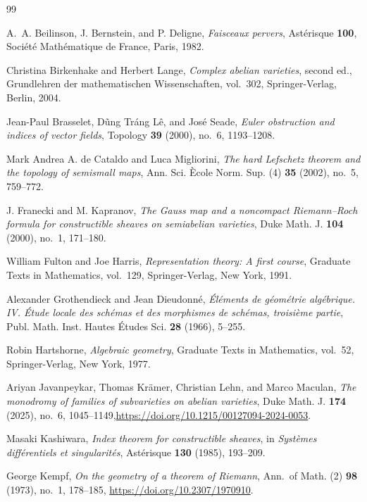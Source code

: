 \begin{thebibliography}{99}

A.~A. Beilinson, J. Bernstein, and P. Deligne,
\emph{Faisceaux pervers}, Ast\'erisque \textbf{100}, Soci\'et\'e Math\'ematique de France, Paris, 1982.

Christina Birkenhake and Herbert Lange,
\emph{Complex abelian varieties}, second ed., Grundlehren der mathematischen Wissenschaften, vol.~302, Springer-Verlag, Berlin, 2004.

Jean-Paul Brasselet, D\~ung Tr\'ang L\^e, and Jos\'e Seade,
\emph{Euler obstruction and indices of vector fields}, Topology \textbf{39} (2000), no.~6, 1193--1208.

Mark Andrea A. de Cataldo and Luca Migliorini,
\emph{The hard Lefschetz theorem and the topology of semismall maps}, Ann. Sci. \`Ecole Norm. Sup. (4) \textbf{35} (2002), no.~5, 759--772.

J. Franecki and M. Kapranov,
\emph{The Gauss map and a noncompact Riemann--Roch formula for constructible sheaves on semiabelian varieties}, Duke Math. J. \textbf{104} (2000), no.~1, 171--180.

William Fulton and Joe Harris,
\emph{Representation theory: A first course}, Graduate Texts in Mathematics, vol.~129, Springer-Verlag, New York, 1991.

Alexander Grothendieck and Jean Dieudonn\'e,
\emph{\'El\'ements de g\'eom\'etrie alg\'ebrique. IV. \'Etude locale des sch\'emas et des morphismes de sch\'emas, troisi\`eme partie}, Publ. Math. Inst. Hautes \'Etudes Sci. \textbf{28} (1966), 5--255.

Robin Hartshorne,
\emph{Algebraic geometry}, Graduate Texts in Mathematics, vol.~52, Springer-Verlag, New York, 1977.

Ariyan Javanpeykar, Thomas Kr\"amer, Christian Lehn, and Marco Maculan,
\emph{The monodromy of families of subvarieties on abelian varieties}, Duke Math. J. \textbf{174} (2025), no.~6, 1045--1149,\newblock \url{https://doi.org/10.1215/00127094-2024-0053}.

Masaki Kashiwara,
\emph{Index theorem for constructible sheaves}, in \emph{Syst\`emes diff\'erentiels et singularit\'es}, Ast\'erisque \textbf{130} (1985), 193--209.

George Kempf,
\emph{On the geometry of a theorem of Riemann}, Ann.\ of Math. (2) \textbf{98} (1973), no.~1, 178--185,
\newblock \url{https://doi.org/10.2307/1970910}.


\end{thebibliography}
